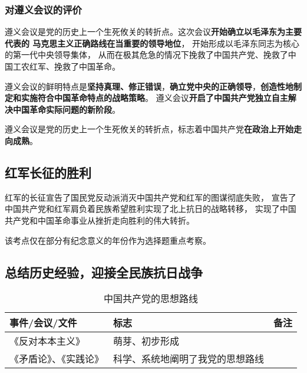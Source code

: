 \documentclass[10pt, UTF8]{ctexbook} %
\begin{document}
\subsubsection{对遵义会议的评价}

遵义会议是党的历史上一个生死攸关的转折点。这次会议\textbf{开始确立以毛泽东为主要代表的
马克思主义正确路线在当重要的领导地位}，
开始形成以毛泽东同志为核心的第一代中央领导集体，
从而在极其危急的情况下挽救了中国共产党、挽救了中国工农红军、挽救了中国革命。

遵义会议的鲜明特点是\textbf{坚持真理、修正错误}，\textbf{确立党中央的正确领导}，\textbf{创造性地制定和实施符合中国革命特点的战略策略}。
遵义会议\textbf{开启了中国共产党独立自主解决中国革命实际问题的新阶段}。

遵义会议是党的历史上一个生死攸关的转折点，标志着中国共产党\textbf{在政治上开始走向成熟}。

\subsection{红军长征的胜利}

红军的长征宣告了国民党反动派消灭中国共产党和红军的图谋彻底失败，
宣告了中国共产党和红军肩负着民族希望胜利实现了北上抗日的战略转移，
实现了中国共产党和中国革命事业从挫折走向胜利的伟大转折。
\begin{remark}
    该考点仅在部分有纪念意义的年份作为选择题重点考察。
\end{remark}



\subsection{总结历史经验，迎接全民族抗日战争}

\begin{table}[H]
    \centering
    \caption{中国共产党的思想路线}
    \begin{tabular}{p{}|p{}p{}}
        \hline 
        \textbf{事件/会议/文件} & \textbf{标志} & \textbf{备注} \\ 
        \hline 
        《反对本本主义》 & 萌芽、初步形成 & \\ 
        \hline 
        《矛盾论》、《实践论》 & 科学、系统地阐明了我党的思想路线 \\ 
        \hline
    \end{tabular}
\end{table}
\end{document}
